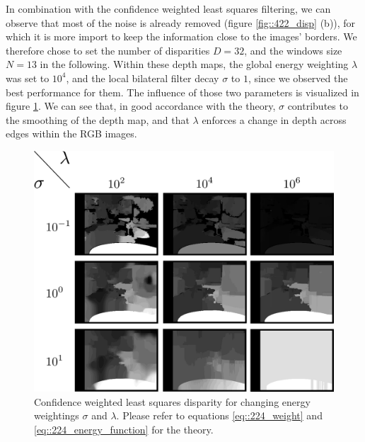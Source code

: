 In combination with the confidence weighted least squares filtering, we can observe that most of the noise is already removed (figure \ref{fig::422_disp} (b)), for which it is more import to keep the information close to the images' borders. We therefore chose to set the number of disparities $D=32$, and the windows size $N=13$ in the following. Within these depth maps, the global energy weighting $\lambda$ was set to $10^4$, and the local bilateral filter decay $\sigma$ to $1$, since we observed the best performance for them. The influence of those two parameters is visualized in figure \ref{fig::422_sigma_lambda}. We can see that, in good accordance with the theory, $\sigma$ contributes to the smoothing of the depth map, and that $\lambda$ enforces a change in depth across edges within the RGB images.
\begin{figure}[h!]
	\centering
	\includegraphics[scale=.2]{chapters/04_experiments/02_autonomous_walking/02_depth_map_parameter_tuning/sigma_lambda.png}
	\caption{Confidence weighted least squares disparity for changing energy weightings $\sigma$ and $\lambda$. Please refer to equations \ref{eq::224_weight} and \ref{eq::224_energy_function} for the theory.}
	\label{fig::422_sigma_lambda}
\end{figure}
\FloatBarrier
